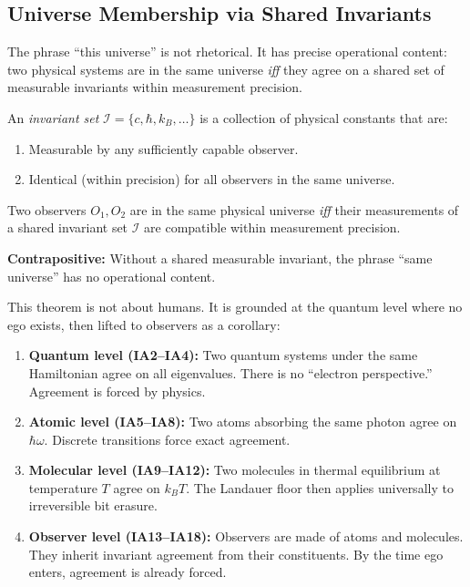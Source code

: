 \subsection{Universe Membership via Shared Invariants}\label{sec:universe-membership}

The phrase ``this universe'' is not rhetorical. It has precise operational content:
two physical systems are in the same universe \emph{iff} they agree on a shared
set of measurable invariants within measurement precision.

\begin{definition}\label{def:invariant-set}
An \emph{invariant set} $\mathcal{I} = \{c, \hbar, k_B, \ldots\}$ is a collection
of physical constants that are:
\begin{enumerate}
\item Measurable by any sufficiently capable observer.
\item Identical (within precision) for all observers in the same universe.
\end{enumerate}
\end{definition}

\begin{theorem}\label{thm:universe-membership}
Two observers $O_1, O_2$ are in the same physical universe \emph{iff} their
measurements of a shared invariant set $\mathcal{I}$ are compatible within
measurement precision.

\textbf{Contrapositive:} Without a shared measurable invariant, the phrase
``same universe'' has no operational content.
\end{theorem}

This theorem is not about humans. It is grounded at the quantum level where
no ego exists, then lifted to observers as a corollary:

\begin{enumerate}
\item \textbf{Quantum level (IA2--IA4):} Two quantum systems under the same
  Hamiltonian agree on all eigenvalues. There is no ``electron perspective.''
  Agreement is forced by physics.

\item \textbf{Atomic level (IA5--IA8):} Two atoms absorbing the same photon
  agree on $\hbar\omega$. Discrete transitions force exact agreement.

\item \textbf{Molecular level (IA9--IA12):} Two molecules in thermal equilibrium
  at temperature $T$ agree on $k_B T$. The Landauer floor then applies
  universally to irreversible bit erasure.

\item \textbf{Observer level (IA13--IA18):} Observers are made of atoms and
  molecules. They inherit invariant agreement from their constituents.
  By the time ego enters, agreement is already forced.
\end{enumerate}


